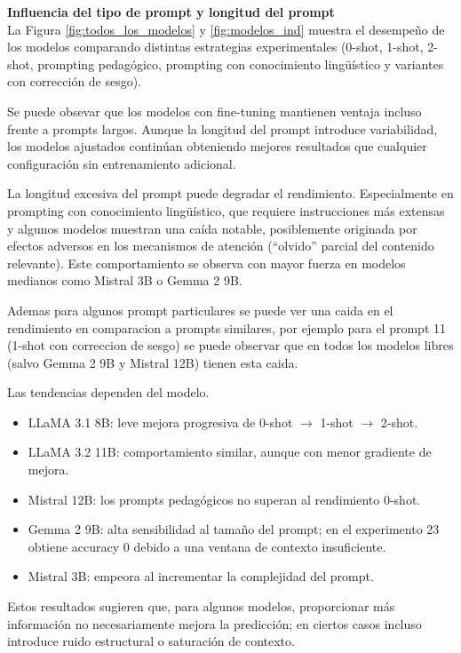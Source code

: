 
\noindent\textbf{Influencia del tipo de prompt y longitud del prompt}\\
La Figura \ref{fig:todos_los_modelos} y \ref{fig:modelos_ind} muestra el desempeño de los modelos comparando distintas estrategias experimentales (0-shot, 1-shot, 2-shot, prompting pedagógico, prompting con conocimiento lingüístico y variantes con corrección de sesgo).

Se puede obsevar que los modelos con fine-tuning mantienen ventaja incluso frente a prompts largos. Aunque la longitud del prompt introduce variabilidad, los modelos ajustados continúan obteniendo mejores resultados que cualquier configuración sin entrenamiento adicional.

La longitud excesiva del prompt puede degradar el rendimiento. Especialmente en prompting con conocimiento lingüístico, que requiere instrucciones más extensas y algunos modelos muestran una caída notable, posiblemente originada por efectos adversos en los mecanismos de atención (“olvido” parcial del contenido relevante). Este comportamiento se observa con mayor fuerza en modelos medianos como Mistral 3B o Gemma 2 9B.

Ademas para algunos prompt particulares se puede ver una caida en el rendimiento en comparacion a prompts similares, por ejemplo para el prompt 11 (1-shot con correccion de sesgo) se puede observar que en todos los modelos libres (salvo Gemma 2 9B y Mistral 12B) tienen esta caida.

Las tendencias dependen del modelo.
\begin{itemize}
    \item LLaMA 3.1 8B: leve mejora progresiva de 0-shot $\rightarrow$ 1-shot $\rightarrow$ 2-shot.
    \item LLaMA 3.2 11B: comportamiento similar, aunque con menor gradiente de mejora.
    \item Mistral 12B: los prompts pedagógicos no superan al rendimiento 0-shot.
    \item Gemma 2 9B: alta sensibilidad al tamaño del prompt; en el experimento 23 obtiene accuracy 0 debido a una ventana de contexto insuficiente.
    \item Mistral 3B: empeora al incrementar la complejidad del prompt.
\end{itemize}

Estos resultados sugieren que, para algunos modelos, proporcionar más información no necesariamente mejora la predicción; en ciertos casos incluso introduce ruido estructural o saturación de contexto.\\

